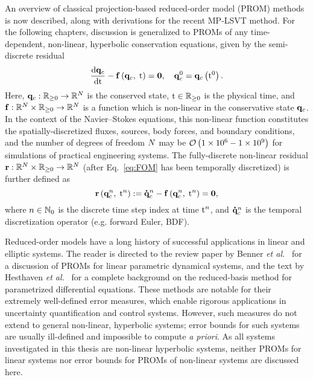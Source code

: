 An overview of classical projection-based reduced-order model (PROM) methods is now described, along with derivations for the recent MP-LSVT method. For the following chapters, discussion is generalized to PROMs of any time-dependent, non-linear, hyperbolic conservation equations, given by the semi-discrete residual
%
\begin{equation}\label{eq:FOM}
    \frac{\text{d} \mathbf{q}_{c}}{\text{d} \text{t}} - \mathbf{f} \left(\mathbf{q}_{c}, \; \text{t}\right) = \mathbf{0}, \quad \mathbf{q}_{c}^0 = \mathbf{q}_{c} \left(\text{t}^0\right).
\end{equation}
%
Here, $\mathbf{q}_{c}: \mathbb{R}_{\ge 0} \rightarrow \mathbb{R}^{N}$ is the conserved state, $\text{t} \in \mathbb{R}_{\ge 0}$ is the physical time, and $\mathbf{f}: \mathbb{R}^{N} \times \mathbb{R}_{\ge 0} \rightarrow \mathbb{R}^{N}$ is a function which is non-linear in the conservative state $\mathbf{q}_{c}$. In the context of the Navier--Stokes equations, this non-linear function constitutes the spatially-discretized fluxes, sources, body forces, and boundary conditions, and the number of degrees of freedom $N$ may be $\mathcal{O}\left(1 \times 10^6 - 1 \times 10^9\right)$ for simulations of practical engineering systems. The fully-discrete non-linear residual $\mathbf{r}: \mathbb{R}^{N} \times \mathbb{R}_{\ge 0} \rightarrow \mathbb{R}^{N}$ (after Eq.~\ref{eq:FOM} has been temporally discretized) is further defined as
%
\begin{equation}
    \mathbf{r}\left(\mathbf{q}_{c}^{n}, \; \text{t}^{n}\right) := \accentset{\mbox{\large\bfseries .}}{\mathbf{q}}_{c}^{n} - \mathbf{f} \left(\mathbf{q}_{c}^{n}, \; \text{t}^{n}\right) = \mathbf{0},
\end{equation}
%
where $n \in \mathbb{N}_0$ is the discrete time step index at time $\text{t}^{n}$, and $\accentset{\mbox{\large\bfseries .}}{\mathbf{q}}_{c}^{n}$ is the temporal discretization operator (e.g. forward Euler, BDF).

Reduced-order models have a long history of successful applications in linear and elliptic systems. The reader is directed to the review paper by Benner \textit{et al.}~\cite{Benner2015} for a discussion of PROMs for linear parametric dynamical systems, and the text by Hesthaven \textit{et al.}~\cite{certRedBasisBook} for a complete background on the reduced-basis method for parametrized differential equations. These methods are notable for their extremely well-defined error measures, which enable rigorous applications in uncertainty quantification and control systems. However, such measures do not extend to general non-linear, hyperbolic systems; error bounds for such systems are usually ill-defined and impossible to compute \textit{a priori}. As all systems investigated in this thesis are non-linear hyperbolic systems, neither PROMs for linear systems nor error bounds for PROMs of non-linear systems are discussed here.